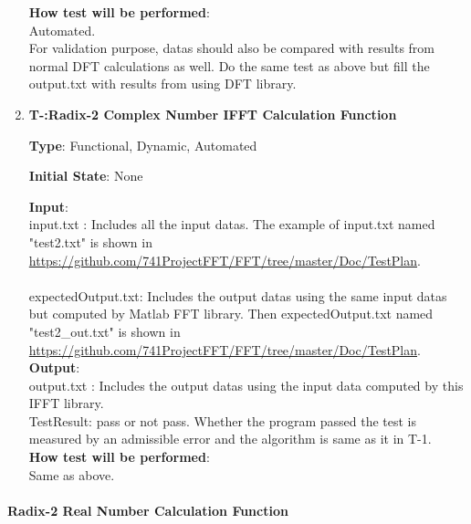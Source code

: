 \documentclass[12pt, titlepage]{article}
\newcounter{tnum}
\begin{document}
\begin{enumerate}
			
\textbf {How test will be performed}: \\
Automated.\\
For validation purpose, datas should also be compared with results from normal DFT calculations as well. Do the same test as above but fill the output.txt with results from using DFT library.

\item{\textbf{T-\thetnum:Radix-2 Complex Number IFFT Calculation Function}}

\textbf {Type}: Functional, Dynamic, Automated
					
\textbf {Initial State}: None
					
\textbf {Input}:\\{\large input.txt} :  Includes all the input datas. The example of input.txt named "test2.txt" is shown in \url{https://github.com/741ProjectFFT/FFT/tree/master/Doc/TestPlan}.\\ \\
{\large expectedOutput.txt}:  Includes the output datas using the same input datas but computed by Matlab FFT library. Then expectedOutput.txt named "test2\_out.txt" is shown in \url{https://github.com/741ProjectFFT/FFT/tree/master/Doc/TestPlan}.\\ 
					
\textbf {Output}: \\{\large output.txt} : Includes the output datas using the input data computed by this IFFT library.\\
{\large TestResult}: pass or not pass. Whether the program passed the test is measured by an admissible error and the algorithm is same as it in T-1.\\
\textbf {How test will be performed}: \\
Same as above.
\end{enumerate}

					
\paragraph{Radix-2 Real Number Calculation Function\\}
\end{document}
